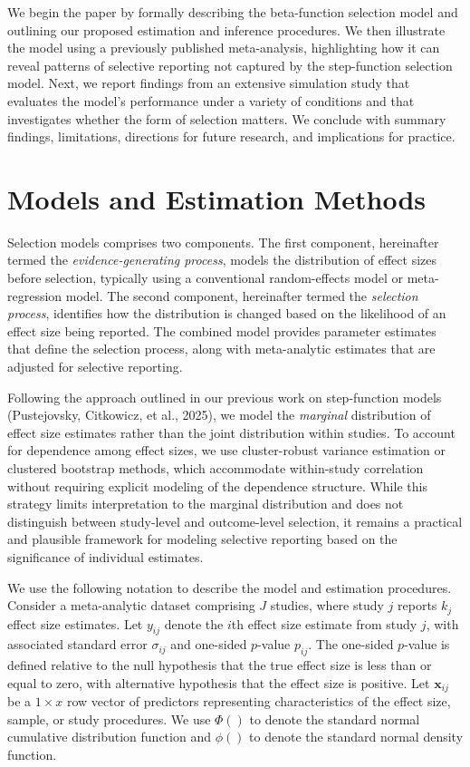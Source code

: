 \documentclass[
  american,
  man, donotrepeattitle,floatsintext]{apa7}
\begin{document}
We begin the paper by formally describing the beta-function selection model and outlining our proposed estimation and inference procedures. We then illustrate the model using a previously published meta-analysis, highlighting how it can reveal patterns of selective reporting not captured by the step-function selection model. Next, we report findings from an extensive simulation study that evaluates the model's performance under a variety of conditions and that investigates whether the form of selection matters. We conclude with summary findings, limitations, directions for future research, and implications for practice.

\section{Models and Estimation Methods}\label{model-and-estimation}

Selection models comprises two components. The first component, hereinafter termed the \emph{evidence-generating process}, models the distribution of effect sizes before selection, typically using a conventional random-effects model or meta-regression model. The second component, hereinafter termed the \emph{selection process}, identifies how the distribution is changed based on the likelihood of an effect size being reported. The combined model provides parameter estimates that define the selection process, along with meta-analytic estimates that are adjusted for selective reporting.

Following the approach outlined in our previous work on step-function models (Pustejovsky, Citkowicz, et al., 2025), we model the \emph{marginal} distribution of effect size estimates rather than the joint distribution within studies. To account for dependence among effect sizes, we use cluster-robust variance estimation or clustered bootstrap methods, which accommodate within-study correlation without requiring explicit modeling of the dependence structure. While this strategy limits interpretation to the marginal distribution and does not distinguish between study-level and outcome-level selection, it remains a practical and plausible framework for modeling selective reporting based on the significance of individual estimates.

We use the following notation to describe the model and estimation procedures. Consider a meta-analytic dataset comprising \(J\) studies, where study \(j\) reports \(k_j\) effect size estimates. Let \(y_{ij}\) denote the \(i\)th effect size estimate from study \(j\), with associated standard error \(\sigma_{ij}\) and one-sided \(p\)-value \(p_{ij}\). The one-sided \(p\)-value is defined relative to the null hypothesis that the true effect size is less than or equal to zero, with alternative hypothesis that the effect size is positive. Let \(\mathbf{x}_{ij}\) be a \(1 \times x\) row vector of predictors representing characteristics of the effect size, sample, or study procedures. We use \(\Phi()\) to denote the standard normal cumulative distribution function and \(\phi()\) to denote the standard normal density function.
\end{document}
